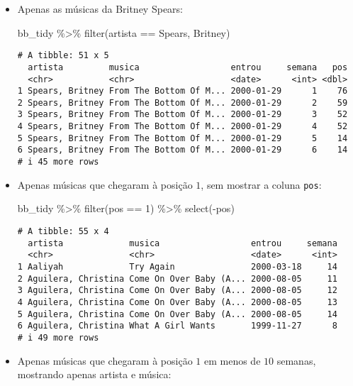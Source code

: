 \documentclass[
  letterpaper,
  DIV=11,
  numbers=noendperiod]{scrreprt}
\newenvironment{Shaded}{\begin{snugshade}}{\end{snugshade}}
\newcommand{\DecValTok}[1]{\textcolor[rgb]{0.68,0.00,0.00}{#1}}
\newcommand{\FunctionTok}[1]{\textcolor[rgb]{0.28,0.35,0.67}{#1}}
\newcommand{\NormalTok}[1]{\textcolor[rgb]{0.00,0.23,0.31}{#1}}
\newcommand{\SpecialCharTok}[1]{\textcolor[rgb]{0.37,0.37,0.37}{#1}}
\newcommand{\StringTok}[1]{\textcolor[rgb]{0.13,0.47,0.30}{#1}}
\begin{document}
\begin{itemize}
\item
  Apenas as músicas da Britney Spears:

\begin{Shaded}
\begin{Highlighting}[]
\NormalTok{bb\_tidy }\SpecialCharTok{\%\textgreater{}\%} 
  \FunctionTok{filter}\NormalTok{(artista }\SpecialCharTok{==} \StringTok{\textquotesingle{}Spears, Britney\textquotesingle{}}\NormalTok{)}
\end{Highlighting}
\end{Shaded}

\begin{verbatim}
# A tibble: 51 x 5
  artista         musica                  entrou     semana   pos
  <chr>           <chr>                   <date>      <int> <dbl>
1 Spears, Britney From The Bottom Of M... 2000-01-29      1    76
2 Spears, Britney From The Bottom Of M... 2000-01-29      2    59
3 Spears, Britney From The Bottom Of M... 2000-01-29      3    52
4 Spears, Britney From The Bottom Of M... 2000-01-29      4    52
5 Spears, Britney From The Bottom Of M... 2000-01-29      5    14
6 Spears, Britney From The Bottom Of M... 2000-01-29      6    14
# i 45 more rows
\end{verbatim}
\item
  Apenas músicas que chegaram à posição $1$, sem mostrar a coluna
  \texttt{pos}:

\begin{Shaded}
\begin{Highlighting}[]
\NormalTok{bb\_tidy }\SpecialCharTok{\%\textgreater{}\%} 
  \FunctionTok{filter}\NormalTok{(pos }\SpecialCharTok{==} \DecValTok{1}\NormalTok{) }\SpecialCharTok{\%\textgreater{}\%} 
  \FunctionTok{select}\NormalTok{(}\SpecialCharTok{{-}}\NormalTok{pos)}
\end{Highlighting}
\end{Shaded}

\begin{verbatim}
# A tibble: 55 x 4
  artista             musica                  entrou     semana
  <chr>               <chr>                   <date>      <int>
1 Aaliyah             Try Again               2000-03-18     14
2 Aguilera, Christina Come On Over Baby (A... 2000-08-05     11
3 Aguilera, Christina Come On Over Baby (A... 2000-08-05     12
4 Aguilera, Christina Come On Over Baby (A... 2000-08-05     13
5 Aguilera, Christina Come On Over Baby (A... 2000-08-05     14
6 Aguilera, Christina What A Girl Wants       1999-11-27      8
# i 49 more rows
\end{verbatim}
\item
  Apenas músicas que chegaram à posição $1$ em menos de $10$ semanas,
  mostrando apenas artista e música:


\end{itemize}
\end{document}
